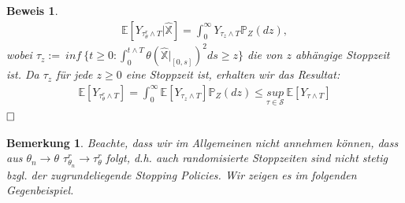\documentclass[12pt,titlepage,headsepline]{article}
\newtheorem*{beweis-non}{Beweis}
\newtheorem*{bemerkung*}{Bemerkung}
\begin{document}
\begin{beweis-non}
{        \begin{align*}
          \mathbb{E}[Y_{\tau_{\theta}^r\land T} \lvert \hat{\mathbb{X}}] = \int_0^{\infty} Y_{\tau_z\land T}\mathbb{P}_Z(dz),
        \end{align*}
        wobei $\tau_z := \ inf \ \{t \geq 0 : \int_0^{t \land T} \theta(\hat{\mathbb{X}}\lvert_{[0,s]})^2ds \geq z \}$ die von $z$ abhängige Stoppzeit ist. Da $\tau_z$ für jede $z \geq 0$ eine Stoppzeit ist, erhalten wir das Resultat:
        \begin{align*}
          \mathbb{E}[Y_{\tau_{\theta}^r\land T}] = \int_0^{\infty}\mathbb{E}[Y_{\tau_z \land T}]\mathbb{P}_Z(dz) \leq \underset{\tau \in \mathcal{S}}{sup} \ \mathbb{E}[Y_{\tau \land T}]
        \end{align*}
        }
        $\hfill\Box$
      \end{beweis-non}
      \begin{bemerkung*}
        \hfill\break
        \textup{
        Beachte, dass wir im Allgemeinen nicht annehmen können, dass aus $\theta_n \rightarrow \theta$ $\tau_{\theta_n}^r \rightarrow \tau_\theta^r$ folgt, d.h. auch randomisierte Stoppzeiten sind nicht stetig bzgl. der zugrundeliegende Stopping Policies. Wir zeigen es im folgenden Gegenbeispiel.
        }
      \end{bemerkung*}
\end{document}
